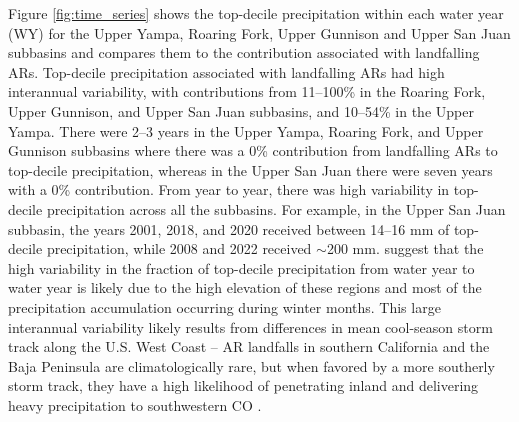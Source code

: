 \documentclass[draft]{agujournal2019}
\begin{document}
Figure \ref{fig:time_series} shows the top-decile precipitation within each water year (WY) for the Upper Yampa, Roaring Fork, Upper Gunnison and Upper San Juan subbasins and compares them to the contribution associated with landfalling ARs. Top-decile precipitation associated with landfalling ARs had high interannual variability, with contributions from 11--100\% in the Roaring Fork, Upper Gunnison, and Upper San Juan subbasins, and 10--54\% in the Upper Yampa. There were 2--3 years in the Upper Yampa, Roaring Fork, and Upper Gunnison subbasins where there was a 0\% contribution from landfalling ARs to top-decile precipitation, whereas in the Upper San Juan there were seven years with a 0\% contribution. From year to year, there was high variability in top-decile precipitation across all the subbasins. For example, in the Upper San Juan subbasin, the years 2001, 2018, and 2020 received between 14--16 mm of top-decile precipitation, while 2008 and 2022 received $\sim$200 mm.  suggest that the high variability in the fraction of top-decile precipitation from water year to water year is likely due to the high elevation of these regions and most of the precipitation accumulation occurring during winter months. This large interannual variability likely results from differences in mean cool-season storm track along the U.S. West Coast – AR landfalls in southern California and the Baja Peninsula are climatologically rare, but when favored by a more southerly storm track, they have a high likelihood of penetrating inland and delivering heavy precipitation to southwestern CO \cite{Rutz2014, Rutz2015}.
\end{document}
